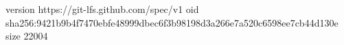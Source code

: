 version https://git-lfs.github.com/spec/v1
oid sha256:9421b9b4f7470ebfe48999dbec6f3b98198d3a266e7a520c6598ee7cb44d130e
size 22004
